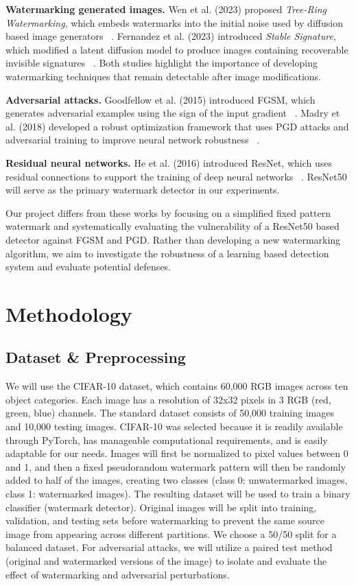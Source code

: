 \documentclass[sigconf, nonacm]{acmart}
\begin{document}
\textbf{Watermarking generated images.} Wen et al. (2023) proposed \textit{Tree-Ring Watermarking}, which embeds watermarks into the initial noise used by diffusion based image generators ~\cite{paper5}. Fernandez et al. (2023) introduced \textit{Stable Signature}, which modified a latent diffusion model to produce images containing recoverable invisible signatures ~\cite{paper6}. Both studies highlight the importance of developing watermarking techniques that remain detectable after image modifications.

\textbf{Adversarial attacks.} Goodfellow et al. (2015) introduced FGSM, which generates adversarial examples using the sign of the input gradient ~\cite{paper2}. Madry et al. (2018) developed a robust optimization framework that uses PGD attacks and adversarial training to improve neural network robustness ~\cite{paper3}.

\textbf{Residual neural networks.} He et al. (2016) introduced ResNet, which uses residual connections to support the training of deep neural networks ~\cite{paper1}. ResNet50 will serve as the primary watermark detector in our experiments.

Our project differs from these works by focusing on a simplified fixed pattern watermark and systematically evaluating the vulnerability of a ResNet50 based detector against FGSM and PGD. Rather than developing a new watermarking algorithm, we aim to investigate the robustness of a learning based detection system and evaluate potential defenses.

\section{Methodology}
\subsection{Dataset \& Preprocessing}
We will use the CIFAR-10 dataset, which contains 60,000 RGB images across ten object categories. Each image has a resolution of 32x32 pixels in 3 RGB (red, green, blue) channels. The standard dataset consists of 50,000 training images and 10,000 testing images. CIFAR-10 was selected because it is readily available through PyTorch, has manageable computational requirements, and is easily adaptable for our needs. Images will first be normalized to pixel values between 0 and 1, and then a fixed pseudorandom watermark pattern will then be randomly added to half of the images, creating two classes (class 0: unwatermarked images, class 1: watermarked images). The resulting dataset will be used to train a binary classifier (watermark detector). Original images will be split into training, validation, and testing sets before watermarking to prevent the same source image from appearing across different partitions. We choose a 50/50 split for a balanced dataset. For adversarial attacks, we will utilize a paired test method (original and watermarked versions of the image) to isolate and evaluate the effect of watermarking and adversarial perturbations.
\end{document}
